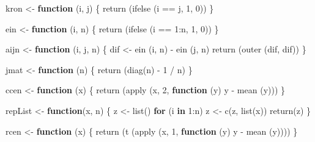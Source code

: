 \documentclass[
  12pt,
  letterpaper,
  DIV=11,
  numbers=noendperiod]{scrreprt}
\newenvironment{Shaded}{\begin{snugshade}}{\end{snugshade}}
\newcommand{\ControlFlowTok}[1]{\textcolor[rgb]{0.00,0.23,0.31}{\textbf{#1}}}
\newcommand{\DecValTok}[1]{\textcolor[rgb]{0.68,0.00,0.00}{#1}}
\newcommand{\FunctionTok}[1]{\textcolor[rgb]{0.28,0.35,0.67}{#1}}
\newcommand{\NormalTok}[1]{\textcolor[rgb]{0.00,0.23,0.31}{#1}}
\newcommand{\OtherTok}[1]{\textcolor[rgb]{0.00,0.23,0.31}{#1}}
\newcommand{\SpecialCharTok}[1]{\textcolor[rgb]{0.37,0.37,0.37}{#1}}
\theoremstyle{remark}
\begin{document}
\begin{Shaded}
\begin{Highlighting}[]
\NormalTok{kron }\OtherTok{\textless{}{-}} \ControlFlowTok{function}\NormalTok{ (i, j) \{}
  \FunctionTok{return}\NormalTok{ (}\FunctionTok{ifelse}\NormalTok{ (i }\SpecialCharTok{==}\NormalTok{ j, }\DecValTok{1}\NormalTok{, }\DecValTok{0}\NormalTok{))}
\NormalTok{\}}

\NormalTok{ein }\OtherTok{\textless{}{-}} \ControlFlowTok{function}\NormalTok{ (i, n) \{}
  \FunctionTok{return}\NormalTok{ (}\FunctionTok{ifelse}\NormalTok{ (i }\SpecialCharTok{==} \DecValTok{1}\SpecialCharTok{:}\NormalTok{n, }\DecValTok{1}\NormalTok{, }\DecValTok{0}\NormalTok{))}
\NormalTok{\}}

\NormalTok{aijn }\OtherTok{\textless{}{-}} \ControlFlowTok{function}\NormalTok{ (i, j, n) \{}
\NormalTok{  dif }\OtherTok{\textless{}{-}} \FunctionTok{ein}\NormalTok{ (i, n) }\SpecialCharTok{{-}} \FunctionTok{ein}\NormalTok{ (j, n)}
  \FunctionTok{return}\NormalTok{ (}\FunctionTok{outer}\NormalTok{ (dif, dif))}
\NormalTok{\}}

\NormalTok{jmat }\OtherTok{\textless{}{-}} \ControlFlowTok{function}\NormalTok{ (n) \{}
  \FunctionTok{return}\NormalTok{ (}\FunctionTok{diag}\NormalTok{(n) }\SpecialCharTok{{-}} \DecValTok{1} \SpecialCharTok{/}\NormalTok{ n)}
\NormalTok{\}}

\NormalTok{ccen }\OtherTok{\textless{}{-}} \ControlFlowTok{function}\NormalTok{ (x) \{}
  \FunctionTok{return}\NormalTok{ (}\FunctionTok{apply}\NormalTok{ (x, }\DecValTok{2}\NormalTok{, }\ControlFlowTok{function}\NormalTok{ (y)}
\NormalTok{    y }\SpecialCharTok{{-}} \FunctionTok{mean}\NormalTok{ (y)))}
\NormalTok{\}}

\NormalTok{repList }\OtherTok{\textless{}{-}} \ControlFlowTok{function}\NormalTok{(x, n) \{}
\NormalTok{  z }\OtherTok{\textless{}{-}} \FunctionTok{list}\NormalTok{()}
  \ControlFlowTok{for}\NormalTok{ (i }\ControlFlowTok{in} \DecValTok{1}\SpecialCharTok{:}\NormalTok{n)}
\NormalTok{    z }\OtherTok{\textless{}{-}} \FunctionTok{c}\NormalTok{(z, }\FunctionTok{list}\NormalTok{(x))}
  \FunctionTok{return}\NormalTok{(z)}
\NormalTok{\}}

\NormalTok{rcen }\OtherTok{\textless{}{-}} \ControlFlowTok{function}\NormalTok{ (x) \{}
  \FunctionTok{return}\NormalTok{ (}\FunctionTok{t}\NormalTok{ (}\FunctionTok{apply}\NormalTok{ (x, }\DecValTok{1}\NormalTok{, }\ControlFlowTok{function}\NormalTok{ (y)}
\NormalTok{    y }\SpecialCharTok{{-}} \FunctionTok{mean}\NormalTok{ (y))))}
\NormalTok{\}}


\end{Highlighting}
\end{Shaded}
\end{document}
